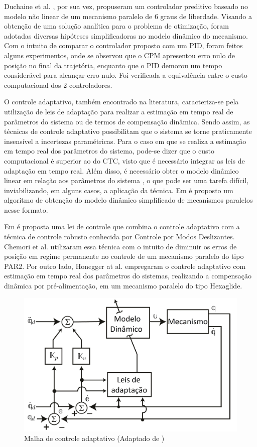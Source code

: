 \documentclass[]{politex}
\begin{document}
Duchaine et al. \cite{Duchaine}, por sua vez, propuseram um controlador preditivo baseado no modelo não linear de um mecanismo paralelo de 6 graus de liberdade. Visando a obtenção de uma solução analítica para o problema de otimização, foram adotadas diversas hipóteses simplificadoras no modelo dinâmico do mecanismo. Com o intuito de comparar o controlador proposto com um PID, foram feitos alguns experimentos, onde se observou  que o CPM apresentou erro nulo de posição no final da trajetória, enquanto que o PID demorou um tempo considerável para alcançar erro nulo. Foi verificada a equivalência entre o custo computacional dos 2 controladores. 

O controle adaptativo, também encontrado na literatura, caracteriza-se pela utilização de leis de adaptação para realizar a estimação em tempo real de parâmetros do sistema ou de termos de compensação dinâmica. Sendo assim, as técnicas de controle adaptativo possibilitam que o sistema se torne praticamente insensível a incertezas paramétricas. Para o caso em que se realiza a estimação em tempo real dos parâmetros do sistema, pode-se dizer que o custo computacional é superior ao do CTC, visto que é necessário integrar as leis de adaptação em tempo real. Além disso, é necessário obter o modelo dinâmico linear em relação aos parâmetros do sistema \cite{SlotiniA}, o que pode ser uma tarefa difícil, inviabilizando, em alguns casos, a aplicação da técnica. Em \cite{Codourey2} é proposto um algoritmo de obtenção do modelo dinâmico simplificado de mecanismos paralelos nesse formato.

Em \cite{SlotiniA} é proposta uma lei de controle que combina o controle adaptativo com a técnica de controle robusto conhecida por Controle por Modos Deslizantes. Chemori et al. \cite{Chemori} utilizaram essa técnica  com o intuito de diminuir os erros de posição em regime permanente no controle de um mecanismo paralelo do tipo PAR2. Por outro lado, Honegger at al. \cite{Honegger} empregaram o controle adaptativo com estimação em tempo real dos parâmetros do sistemas, realizando a compensação dinâmica por pré-alimentação, em um mecanismo  paralelo do tipo Hexaglide.

\begin{figure}[h]
	\centering
	\includegraphics[scale=0.385]{../figures/CA.jpg}  
	\caption{Malha de controle adaptativo (Adaptado de \cite{Craig})}
	\label{fig:CA}
\end{figure}
\end{document}
